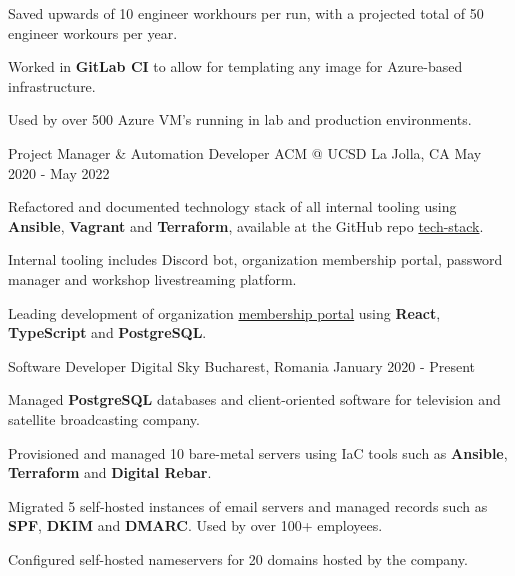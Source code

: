 \begin{cventries}
{\begin{cvitems}
        \item {Saved upwards of 10 engineer workhours per run, with a projected total of 50 engineer workours per year.}
        \item {Worked in \textbf{GitLab CI} to allow for templating any image for Azure-based infrastructure.}
        \item {Used by over 500 Azure VM's running in lab and production environments.}
      \end{cvitems}
    }
  \cventry
  {Project Manager \& Automation Developer}
  {ACM @ UCSD}
  {La Jolla, CA}
  {May 2020 - May 2022}
  {
    \begin{cvitems}
      \item {Refactored and documented technology stack of all internal tooling using \textbf{Ansible}, \textbf{Vagrant} and \textbf{Terraform}, available at the GitHub repo \href{https://github.com/acmucsd/tech-stack}{tech-stack}.}
      \item {Internal tooling includes Discord bot, organization membership portal, password manager and workshop livestreaming platform.}
      \item {Leading development of organization \href{https://github.com/acmucsd/membership-portal-ui}{membership portal} using \textbf{React}, \textbf{TypeScript} and \textbf{PostgreSQL}.}
    \end{cvitems}
  }
  \cventry
    {Software Developer}
    {Digital Sky}
    {Bucharest, Romania}
    {January 2020 - Present}
    {
      \begin{cvitems}
        \item {Managed \textbf{PostgreSQL} databases and client-oriented software for television and satellite broadcasting company.}
        \item {Provisioned and managed 10 bare-metal servers using IaC tools such as \textbf{Ansible}, \textbf{Terraform} and \textbf{Digital Rebar}.}
        \item {Migrated 5 self-hosted instances of email servers and managed records such as \textbf{SPF}, \textbf{DKIM} and \textbf{DMARC}. Used by over 100+ employees.}
        \item {Configured self-hosted nameservers for 20 domains hosted by the company.}
      \end{cvitems}
    }
\end{cventries}
